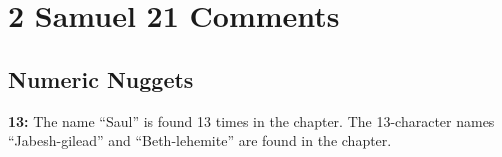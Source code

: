 \section{2 Samuel 21 Comments}

\subsection{Numeric Nuggets}
\textbf{13: } The name ``Saul'' is found 13 times in the chapter. The 13-character names ``Jabesh-gilead'' and ``Beth-lehemite'' are found in the chapter.